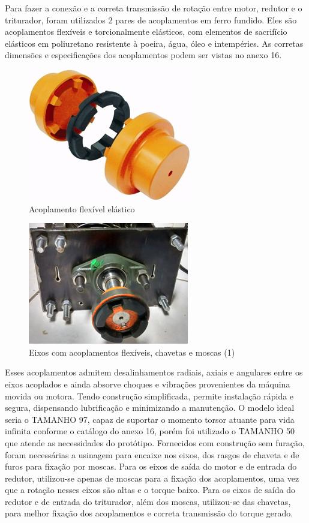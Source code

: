 Para fazer a conexão e a correta transmissão de rotação entre motor, redutor e o triturador, foram utilizados 2 pares de acoplamentos em ferro fundido. Eles são acoplamentos flexíveis e torcionalmente elásticos, com elementos de sacrifício elásticos em poliuretano resistente à poeira, água, óleo e intempéries. As corretas dimensões e especificações dos acoplamentos podem ser vistas no anexo 16.

\begin{figure}[!h]
	\centering
		\includegraphics[scale=0.4]{figuras/estrutura/17.png}
	\caption{Acoplamento flexível elástico}
\end{figure}

\begin{figure}[!h]
	\centering
		\includegraphics[scale=0.4]{figuras/estrutura/18(1).png}
	\caption{Eixos com acoplamentos flexíveis, chavetas e moscas (1)}
\end{figure}

Esses acoplamentos admitem desalinhamentos radiais, axiais e angulares entre os eixos acoplados e ainda absorve choques e vibrações provenientes da máquina movida ou motora. Tendo construção simplificada, permite instalação rápida e segura, dispensando lubrificação e minimizando a manutenção. O modelo ideal seria o TAMANHO 97, capaz de suportar o momento torsor atuante para vida infinita conforme o catálogo do anexo 16, porém foi utilizado o TAMANHO 50 que atende as necessidades do protótipo. Fornecidos com construção sem furação, foram necessárias a usinagem para encaixe nos eixos, dos rasgos de chaveta e de furos  para fixação por moscas. Para os eixos de saída do motor e de entrada do redutor, utilizou-se apenas de moscas para a fixação dos acoplamentos, uma vez que a rotação nesses eixos são altas e o torque baixo. Para os eixos de saída do redutor e de entrada do triturador, além dos moscas, utilizou-se das chavetas, para melhor fixação dos acoplamentos e correta transmissão do torque gerado.  


